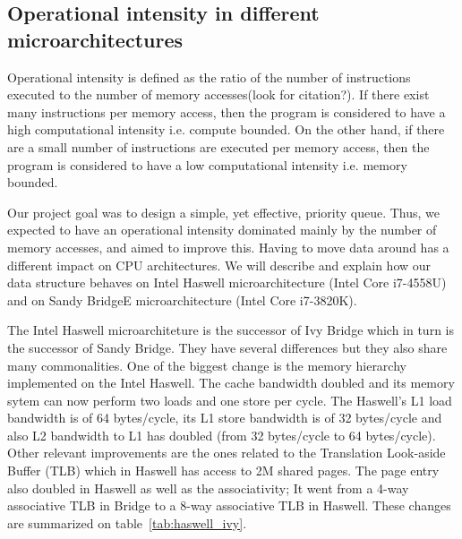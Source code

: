 \subsection{Operational intensity in different microarchitectures}
Operational intensity is defined as the ratio of the number of instructions executed to the number of memory accesses(look for citation?). If there exist many instructions per memory access, then the program is considered to have a high computational intensity i.e. compute bounded. On the other hand, if there are a small number of instructions are executed per memory access, then the program is considered to have a low computational intensity i.e. memory bounded.

Our project goal was to design a simple, yet effective, priority queue. Thus, we expected to have an operational intensity dominated mainly by the number of memory accesses, and aimed to improve this. Having to move data around has a different impact on CPU architectures. We will describe and explain how our data structure behaves on Intel Haswell microarchitecture (Intel Core i7-4558U) and on Sandy BridgeE microarchitecture (Intel Core i7-3820K). 

The Intel Haswell microarchiteture is the successor of Ivy Bridge which in turn is the successor of Sandy Bridge. They have several differences but they also share many commonalities. One of the biggest change is the memory hierarchy implemented on the Intel Haswell. The cache bandwidth doubled and its memory sytem can now perform two loads and one store per cycle. The Haswell's L1 load bandwidth is of 64 bytes/cycle, its L1 store bandwidth is of 32 bytes/cycle and also L2 bandwidth to L1 has doubled (from 32 bytes/cycle to 64 bytes/cycle). Other relevant improvements are the ones related to the Translation Look-aside Buffer (TLB) which in Haswell has access to 2M shared pages. The page entry also doubled in Haswell as well as the associativity; It went from a 4-way associative TLB in 
 Bridge to a 8-way associative TLB in Haswell. These changes are summarized on table~\ref{tab:haswell_ivy}.

